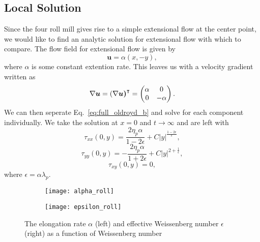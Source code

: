 \subsection{Local Solution}
Since the four roll mill gives rise to a simple extensional flow at the center point, we would like to find an analytic solution for extensional flow with which to compare. The flow field for extensional flow is given by
\begin{equation}
\bm{u} = \alpha(x, -y),
\end{equation}
where $\alpha$ is some constant extention rate. This leaves us with a velocity gradient written as
\begin{equation}
\nabla\bm{u} = \left(\nabla \bm{u\right)}^\intercal = 
\begin{pmatrix}
\alpha & 0 \\
0 & -\alpha
\end{pmatrix}.
\end{equation}
We can then seperate Eq.~\eqref{eq:full_oldroyd_b} and solve for each component individually. We take the solution at $x = 0$ and $t \rightarrow \infty$ and are left with
\begin{equation}
\tau_{xx}(0,y) = \frac{2\eta_p\alpha}{1 - 2\epsilon} + C\lvert y\rvert^\frac{1-2\epsilon}{\epsilon},
\end{equation}
\begin{equation}
\tau_{yy}(0,y) = -\frac{2\eta_p\alpha}{1 + 2\epsilon} + C\lvert y\rvert^{2+ \frac{1}{\epsilon}},
\end{equation}
\begin{equation}
\tau_{xy}(0,y) =0,
\end{equation}
where $\epsilon = \alpha \lambda_p$.

\begin{figure}[htbp]
	\centering
\begin{subfigure}{0.5\linewidth}
	\texttt{[image: alpha\_roll]}
	\label{fig:alpha_roll}
\end{subfigure}\hfill
\begin{subfigure}{0.5\linewidth}
	\texttt{[image: epsilon\_roll]}
	\label{fig:epsilon_roll}
\end{subfigure}
\caption{The elongation rate $\alpha$ (left) and effective Weissenberg number $\epsilon$ (right) as a function of Weissenberg number}
\label{fig:four_roll_parameters}
\end{figure}

